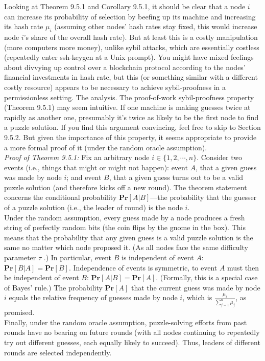 Looking at Theorem 9.5.1 and Corollary 9.5.1, it should be clear that a node $i$ can increase
its probability of selection by beefing up its machine and increasing its hash rate $\mu_i$ (assuming
other nodes’ hash rates stay fixed, this would increase node $i$’s share of the overall hash rate).
But at least this is a costly manipulation (more computers \Rightarrow more money), unlike sybil
attacks, which are essentially costless (repeatedly enter ssh-keygen at a Unix prompt). You
might have mixed feelings about divvying up control over a blockchain protocol according to
the nodes’ financial investments in hash rate, but this (or something similar with a different
costly resource) appears to be necessary to achieve sybil-proofness in a permissionless setting.
The analysis. The proof-of-work sybil-proofness property (Theorem 9.5.1) may seem intuitive.
If one machine is making guesses twice at rapidly as another one, presumably it’s twice as
likely to be the first node to find a puzzle solution. If you find this argument convincing, feel
free to skip to Section 9.5.2. But given the importance of this property, it seems appropriate
to provide a more formal proof of it (under the random oracle assumption).\\

\noindent
\textit{Proof of Theorem 9.5.1:} Fix an arbitrary node $i \in \{1, 2, \cdots, n\}$. Consider two events (i.e.,
things that might or might not happen): event $A$, that a given guess was made by node $i$;
and event $B$, that a given guess turns out to be a valid puzzle solution (and therefore kicks off a new round). The theorem statement concerns the conditional probability $\textbf{Pr}[A|B]$—the probability that the guesser of a puzzle solution (i.e., the leader of round) is the node $i$.\\
Under the random assumption, every guess made by a node produces a fresh
string of perfectly random bits (the coin flips by the gnome in the box). This means that the
probability that any given guess is a valid puzzle solution is the same no matter which node
proposed it. (As all nodes face the same difficulty parameter $\tau$ .) In particular, event $B$ is
independent of event $A$: $\textbf{Pr}[B|A] = \textbf{Pr}[B]$. Independence of events is symmetric, to event $A$
must then be independent of event $B$: $\textbf{Pr}[A|B] = \textbf{Pr}[A]$. (Formally, this is a special case of
Bayes’ rule.) The probability $\textbf{Pr}[A]$ that the current guess was made by node $i$ equals the
relative frequency of guesses made by node $i$, which is $\frac{\mu_i}{\sum_{j=1}^n \mu_j}$, as promised.\\
Finally, under the random oracle assumption, puzzle-solving efforts from past rounds have
no bearing on future rounds (with all nodes continuing to repeatedly try out different guesses,
each equally likely to succeed). Thus, leaders of different rounds are selected independently.

